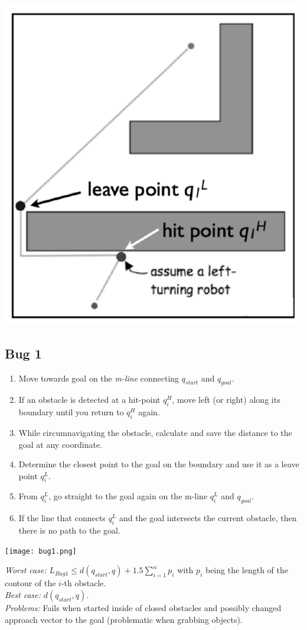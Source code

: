 \begin{multicols*}{2}
\begin{center}
\includegraphics[width=0.4\columnwidth]{bug0.png}
\end{center}

\subsection{Bug 1}
\begin{enumerate}
	\item Move towards goal on the \textit{m-line} connecting $q_{start}$ and $q_{goal}$.
	\item If an obstacle is detected at a hit-point $q^H_i$, move left (or right) along its boundary until you return to $q^H_i$ again.
	\item While circumnavigating the obstacle, calculate and save the distance to the goal at any coordinate.
	\item Determine the closest point to the goal on the boundary and use it as a leave point $q^L_i$.
	\item From $q^L_i$, go straight to the goal again on the m-line $q^L_i$ and $q_{goal}$.
	\item If the line that connects $q^L_i$ and the goal intersects the current obstacle, then there is no path to the goal.
\end{enumerate}
\begin{center}
\texttt{[image: bug1.png]}
\end{center}

\noindent \textit{Worst case:} $L_{Bug1} \leq d(q_{start}, q)+1.5\sum_{i=1}^{n} p_i$ with $p_i$ being the length of the contour of the $i$-th obstacle.\\
\textit{Best case:} $d(q_{start}, q)$.\\
\textit{Problems:} Fails when started inside of closed obstacles and possibly changed approach vector to the goal (problematic when grabbing objects).


\end{multicols*}
